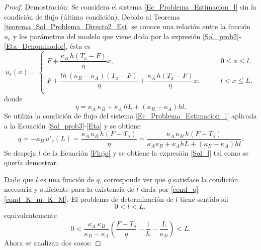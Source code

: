 \begin{proof}{Demostraci\'on:}
%
Se considera el sistema \eqref{Ec_Problema_Estimacion_l} sin la condici\'on de flujo (\'ultima condici\'on). Debido al Teorema \ref{teorema_Sol_Problema_Directo2_Est} 
se conoce una relaci\'on entre la funci\'on $u_e$ y los par\'ametros del modelo que viene dada por la expresi\'on \eqref{Sol_prob2}-\eqref{Eta_Denominador}, \'esta es
%
\begin{equation}
\label{Sol_prob3}
u_{e}(x)=
\begin{cases} 
F+\dfrac{\kappa_B \, h (T_a-F)}{\eta} x,  \qquad & 0 \leq x \leq l, \\
F+ \dfrac{l h \, (\kappa_B-\kappa_A) (T_a-F)  }{\eta}+\dfrac{\kappa_A  \, h (T_a-F)}{\eta} x,  \qquad & l<x \leq L, \\
\end{cases}
\end{equation}
%        
donde 
%
\begin{equation}
\label{Eta}
\eta=\kappa_A \, \kappa_B +\kappa_A  \, hL+(\kappa_B -\kappa_A)hl.
\end{equation}
% 
Se utiliza la condici\'on de flujo del sistema \eqref{Ec_Problema_Estimacion_l} aplicada a la Ecuaci\'on \eqref{Sol_prob3}-\eqref{Eta} y se obtiene
%
\begin{equation}
\label{Flujo}
q=-\kappa_B \, u'_{e}(L)=\dfrac{\kappa_A \,\kappa_B \,h(F-T_a)}{\eta}=\dfrac{\kappa_A \,\kappa_B \,h(F-T_a)}{\kappa_A \kappa_B +\kappa_A hL+(\kappa_B -\kappa_A)hl}.
\end{equation}
%
Se despeja $l$ de la Ecuaci\'on \eqref{Flujo} y se obtiene la expresi\'on \eqref{Sol_l} tal como se quer\'ia demostrar.

Dado que $l$ es una funci\'on de $q$, corresponde ver que $q$ satisface la condici\'on necesaria y suficiente para la existencia de $l$ dada por \eqref{cond_q}-\eqref{cond_K_m_K_M}.
El problema de determinaci\'on de $l$ tiene sentido sii
%
\begin{equation*}
\label{cotas_l}
0<l<L,
\end{equation*}
%
equivalentemente
%
\begin{equation}
\label{cotas_l2}
0<\dfrac{\kappa_A \, \kappa_B}{\kappa_B-\kappa_A}\left(\dfrac{F-T_a}{q}-\dfrac{1}{h}-\dfrac{L}{\kappa_B}\right)<L.
\end{equation}
%
Ahora se analizan dos casos:


\end{proof}
